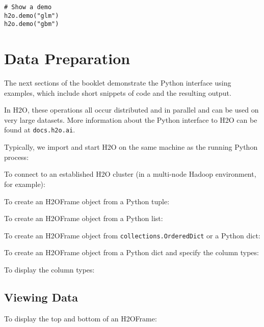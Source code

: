 {\begin{lstlisting}[style=pythoncode]
# Show a demo
h2o.demo("glm")
h2o.demo("gbm")
\end{lstlisting}


\section{Data Preparation}
The next sections of the booklet demonstrate the Python interface using examples, which include  short snippets of code and the
resulting output.  

In H2O, these operations all occur distributed and in
parallel and can be used on very large datasets.  More information about the
Python interface to H2O can be found at {\texttt{docs.h2o.ai}}.

Typically, we import and start H2O on the same machine as the running Python process:


To connect to an established H2O cluster (in a multi-node Hadoop environment, for example):


To create an H2OFrame object from a Python tuple:


To create an H2OFrame object from a Python list:


To create an H2OFrame object from \texttt{collections.OrderedDict} or a Python dict:


To create an H2OFrame object from a Python dict and specify the column types:


To display the column types:


\subsection{Viewing Data}
To display the top and bottom of an H2OFrame:



}
